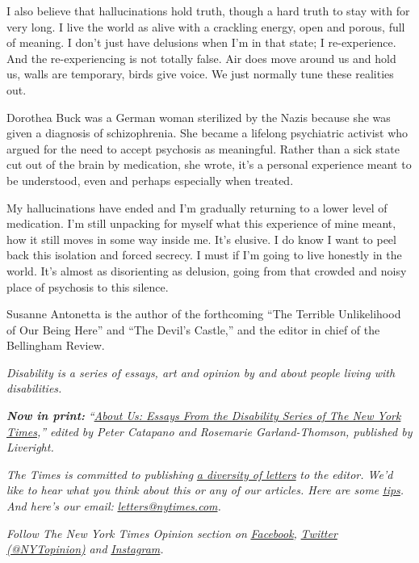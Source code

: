 I also believe that hallucinations hold truth, though a hard truth to
stay with for very long. I live the world as alive with a crackling
energy, open and porous, full of meaning. I don't just have delusions
when I'm in that state; I re-experience. And the re-experiencing is not
totally false. Air does move around us and hold us, walls are temporary,
birds give voice. We just normally tune these realities out.

Dorothea Buck was a German woman sterilized by the Nazis because she was
given a diagnosis of schizophrenia. She became a lifelong psychiatric
activist who argued for the need to accept psychosis as meaningful.
Rather than a sick state cut out of the brain by medication, she wrote,
it's a personal experience meant to be understood, even and perhaps
especially when treated.

My hallucinations have ended and I'm gradually returning to a lower
level of medication. I'm still unpacking for myself what this experience
of mine meant, how it still moves in some way inside me. It's elusive. I
do know I want to peel back this isolation and forced secrecy. I must if
I'm going to live honestly in the world. It's almost as disorienting as
delusion, going from that crowded and noisy place of psychosis to this
silence.

Susanne Antonetta is the author of the forthcoming ``The Terrible
Unlikelihood of Our Being Here'' and ``The Devil's Castle,'' and the
editor in chief of the Bellingham Review.

\emph{Disability is a series of essays, art and opinion by and about
people living with disabilities.}

\emph{\textbf{Now in print:}}
\emph{``}\href{https://www.aboutusbook.com/}{\emph{About Us: Essays From
the Disability Series of The New York Times}}\emph{,'' edited by Peter
Catapano and Rosemarie Garland-Thomson, published by Liveright.}

\emph{The Times is committed to publishing}
\href{https://www.nytimes.com/2019/01/31/opinion/letters/letters-to-editor-new-york-times-women.html}{\emph{a
diversity of letters}} \emph{to the editor. We'd like to hear what you
think about this or any of our articles. Here are some}
\href{https://help.nytimes.com/hc/en-us/articles/115014925288-How-to-submit-a-letter-to-the-editor}{\emph{tips}}\emph{.
And here's our email:}
\href{mailto:letters@nytimes.com}{\emph{letters@nytimes.com}}\emph{.}

\emph{Follow The New York Times Opinion section on}
\href{https://www.facebook.com/nytopinion}{\emph{Facebook}}\emph{,}
\href{http://twitter.com/NYTOpinion}{\emph{Twitter (@NYTopinion)}}
\emph{and}
\href{https://www.instagram.com/nytopinion/}{\emph{Instagram}}\emph{.}

